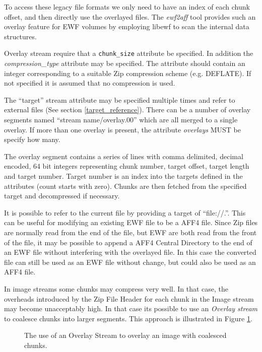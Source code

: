 \documentclass[10pt, conference]{IEEEtran}
\begin{document}
To access these legacy file formats we only need to have an index of
each chunk offset, and then directly use the overlayed files.  The {\em
ewf2aff} tool provides such an overlay feature for EWF volumes by
employing libewf to scan the internal data structures.

Overlay stream require that a \texttt{chunk\_size} attribute be specified. In
addition the {\em compression\_type} attribute may be specified. The
attribute should contain an integer corresponding to a suitable Zip
compression scheme (e.g. DEFLATE). If not specified it is assumed
that no compression is used.

The ``target'' stream attribute may be specified multiple times and
refer to external files (See section \ref{target_reference}). There
can be a number of overlay segments named ``stream name/overlay.00''
which are all merged to a single overlay. If more than one overlay is
present, the attribute {\em overlays} MUST be specify how many.

The overlay segment contains a series of lines with comma delimited,
decimal encoded, 64 bit integers representing chunk number, target
offset, target length and target number. Target number is an index
into the targets defined in the attributes (count starts with zero).
Chunks are then fetched from the specified target and decompressed if
necessary.

It is possible to refer to the current file by providing a target of
``file://.''. This can be useful for modifying an existing EWF file to
be a AFF4 file. Since Zip files are normally read from the end of the
file, but EWF are both read from the front of the file, it may
be possible to append a AFF4 Central Directory to the end of an EWF file without
interfering with the overlayed file. In this case the converted file
can still be used as an EWF file without change, but could also be
used as an AFF4 file.

In image streams some chunks may compress very well. In that case, the
overheads introduced by the Zip File Header for each chunk in the
Image stream may become unacceptably high. In that case its possible
to use an {\em Overlay stream} to coalesce chunks into larger
segments. This approach is illustrated in Figure \ref{overlay}.

\begin{figure}[tb]
  \begin{center}
  \mbox{\columnwidth {}}
  \caption{The use of an Overlay Stream to overlay an image with
coalesced chunks.}
  \label{overlay}
  \end{center}
\end{figure}
\end{document}
